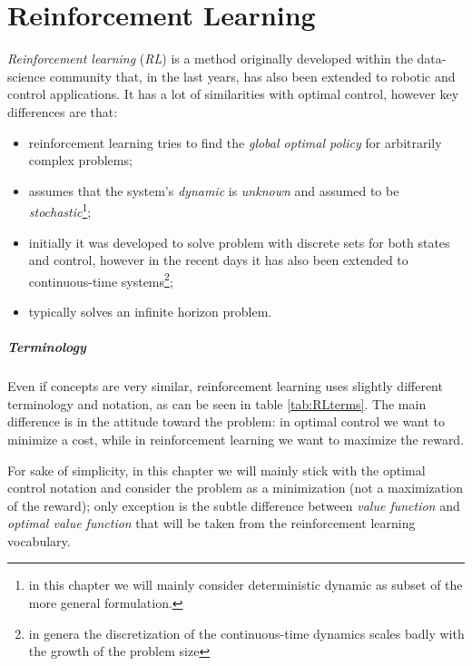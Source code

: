 \chapter{Reinforcement Learning}
	\textit{Reinforcement learning} (\textit{RL}) is a method originally developed within the data-science community that, in the last years, has also been extended to robotic and control applications. It has a lot of similarities with optimal control, however key differences are that:
	\begin{itemize}
		\item reinforcement learning tries to find the \textit{global optimal policy} for arbitrarily complex problems;
		\item assumes that the system's \textit{dynamic} is \textit{unknown} and assumed to be \textit{stochastic}\footnote{in this chapter we will mainly consider deterministic dynamic as subset of the more general formulation.};
		\item initially it was developed to solve problem with discrete sets for both states and control, however in the recent days it has also been extended to continuous-time systems\footnote{in genera the discretization of the continuous-time dynamics scales badly with the growth of the problem size};
		\item typically solves an infinite horizon problem.
	\end{itemize}

	\paragraph{Terminology} Even if concepts are very similar, reinforcement learning uses slightly different terminology and notation, as can be seen in table \ref{tab:RLterms}. The main difference is in the attitude toward the problem: in optimal control we want to minimize a cost, while in reinforcement learning we want to maximize the reward.
	
	
	
	For sake of simplicity, in this chapter we will mainly stick with the optimal control notation and consider the problem as a minimization (not a maximization of the reward); only exception is the subtle difference between \textit{value function} and \textit{optimal value function} that will be taken from the reinforcement learning vocabulary.
	
